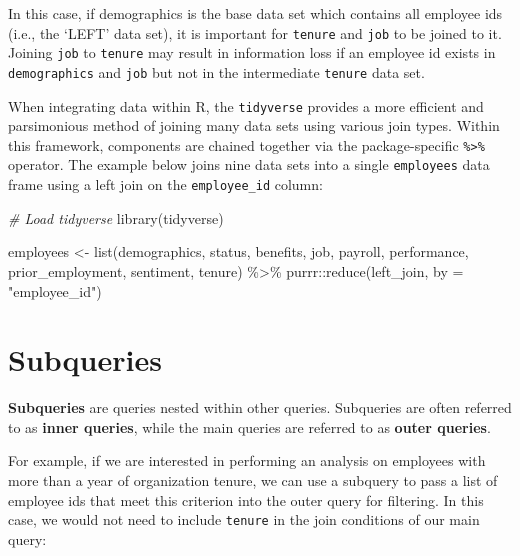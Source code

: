 \documentclass[
]{book}
\newenvironment{Shaded}{\begin{snugshade}}{\end{snugshade}}
\newcommand{\AttributeTok}[1]{\textcolor[rgb]{0.77,0.63,0.00}{#1}}
\newcommand{\CommentTok}[1]{\textcolor[rgb]{0.56,0.35,0.01}{\textit{#1}}}
\newcommand{\FunctionTok}[1]{\textcolor[rgb]{0.00,0.00,0.00}{#1}}
\newcommand{\NormalTok}[1]{#1}
\newcommand{\OtherTok}[1]{\textcolor[rgb]{0.56,0.35,0.01}{#1}}
\newcommand{\SpecialCharTok}[1]{\textcolor[rgb]{0.00,0.00,0.00}{#1}}
\newcommand{\StringTok}[1]{\textcolor[rgb]{0.31,0.60,0.02}{#1}}
\begin{document}
In this case, if demographics is the base data set which contains all employee ids (i.e., the `LEFT' data set), it is important for \texttt{tenure} and \texttt{job} to be joined to it. Joining \texttt{job} to \texttt{tenure} may result in information loss if an employee id exists in \texttt{demographics} and \texttt{job} but not in the intermediate \texttt{tenure} data set.

When integrating data within R, the \texttt{tidyverse} provides a more efficient and parsimonious method of joining many data sets using various join types. Within this framework, components are chained together via the package-specific \texttt{\%\textgreater{}\%} operator. The example below joins nine data sets into a single \texttt{employees} data frame using a left join on the \texttt{employee\_id} column:

\begin{Shaded}
\begin{Highlighting}[]
\CommentTok{\# Load tidyverse}
\FunctionTok{library}\NormalTok{(tidyverse)}

\NormalTok{employees }\OtherTok{\textless{}{-}} \FunctionTok{list}\NormalTok{(demographics,}
\NormalTok{                  status,}
\NormalTok{                  benefits,}
\NormalTok{                  job,}
\NormalTok{                  payroll,}
\NormalTok{                  performance,}
\NormalTok{                  prior\_employment,}
\NormalTok{                  sentiment,}
\NormalTok{                  tenure) }\SpecialCharTok{\%\textgreater{}\%}
\NormalTok{                  purrr}\SpecialCharTok{::}\FunctionTok{reduce}\NormalTok{(left\_join, }\AttributeTok{by =} \StringTok{"employee\_id"}\NormalTok{)}
\end{Highlighting}
\end{Shaded}

\hypertarget{subqueries}{%
\section{Subqueries}\label{subqueries}}

\textbf{Subqueries} are queries nested within other queries. Subqueries are often referred to as \textbf{inner queries}, while the main queries are referred to as \textbf{outer queries}.

For example, if we are interested in performing an analysis on employees with more than a year of organization tenure, we can use a subquery to pass a list of employee ids that meet this criterion into the outer query for filtering. In this case, we would not need to include \texttt{tenure} in the join conditions of our main query:
\end{document}
